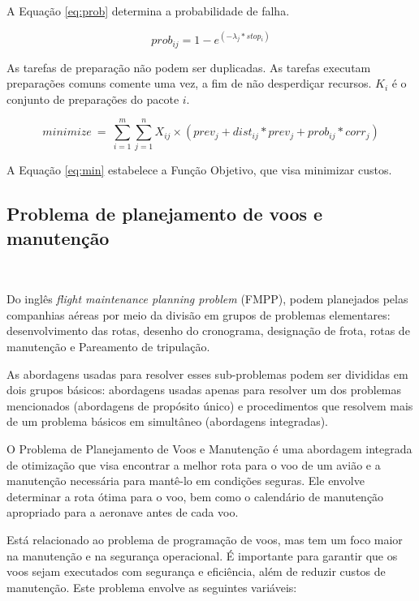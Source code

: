 \documentclass{abntex2}
\begin{document}
\begin{sloppypar}
A Equação  \ref{eq:prob} determina a probabilidade de falha.

\begin{equation}\label{eq:prob}
prob_{ij} = 1 - e^{(-\lambda{}_j * stop_i)}
\end{equation}

As tarefas de preparação não podem ser duplicadas. As tarefas executam preparações comuns comente uma vez, a fim de não desperdiçar recursos.
$K_i$ é o conjunto de preparações do pacote $i$.

\begin{equation} \label{eq:min}
minimize\ =\ \sum_{i=1}^{m} \sum_{j=1}^{n} X_{ij} \times ( prev_j + dist_{ij}*prev_j + prob_{ij}*corr_j )
\end{equation}

A Equação \ref{eq:min} estabelece a Função Objetivo, que visa minimizar custos.


\subsection{Problema de planejamento de voos e manutenção}\

Do inglês \textit{flight maintenance planning problem} (FMPP), podem planejados pelas companhias aéreas por meio da divisão em grupos de problemas elementares: desenvolvimento das rotas, desenho do cronograma, designação de frota, rotas de manutenção e Pareamento de tripulação. 

As abordagens usadas para resolver esses sub-problemas podem ser divididas em dois grupos básicos: abordagens usadas apenas para resolver um dos problemas mencionados (abordagens de propósito único) e procedimentos que resolvem mais de um problema básicos em simultâneo (abordagens integradas).

O Problema de Planejamento de Voos e Manutenção é uma abordagem integrada de otimização que visa encontrar a melhor rota para o voo de um avião e a manutenção necessária para mantê-lo em condições seguras. Ele envolve determinar a rota ótima para o voo, bem como o calendário de manutenção apropriado para a aeronave antes de cada voo.

Está relacionado ao problema de programação de voos, mas tem um foco maior na manutenção e na segurança operacional. É importante para garantir que os voos sejam executados com segurança e eficiência, além de reduzir custos de manutenção. Este problema envolve as seguintes variáveis:

\vspace{0.5cm}


\end{sloppypar}
\end{document}
